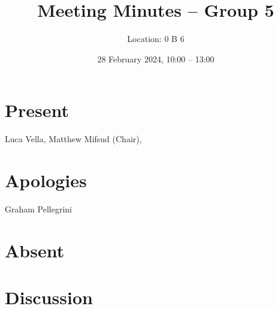 \documentclass{cce2014-meetings}
\title{Meeting Minutes -- Group 5}
\author{Location: 0 B 6}
\date{28 February 2024, 10:00 -- 13:00}
\begin{document}
\maketitle

\section*{Present}
Luca Vella,
Matthew Mifsud (Chair),

\section*{Apologies}
Graham Pellegrini

\section*{Absent}

\section*{Discussion}
\end{document}
